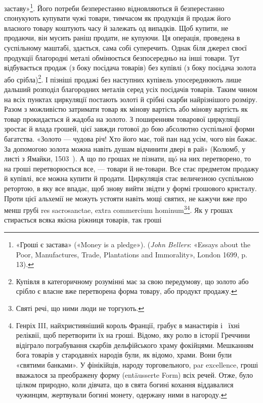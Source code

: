 \parcont{}  %
заставу»\footnote{
«Гроші є застава» («Money is a pledge»). (\emph{John Bellers}: «Essays
about the Poor, Manufactures, Trade, Plantations and Immorality», London
1699, p. 13).
}. Його потреби безперестанно відновляються й безперестанно
спонукують купувати чужі товари, тимчасом як продукція
й продаж його власного товару коштують часу й залежать
од випадків. Щоб купити, не продаючи, він мусить раніш продати,
не купуючи. Ця операція, проведена в суспільному маштабі,
здається, сама собі суперечить. Однак біля джерел своєї продукції
благородні металі обмінюється безпосередньо на інші товари.
Тут відбувається продаж (з боку посідача товарів) без купівлі
(з боку посідача золота або срібла)\footnote{
Купівля в категоричному розумінні має за свою передумову, що
золото або срібло є власне вже перетворена форма товару, або продукт
продажу.
}. І пізніші продажі без наступних
купівель упосереднюють лише дальший розподіл благородних
металів серед усіх посідачів товарів. Таким чином на
всіх пунктах циркуляції постають золоті й срібні скарби найрізнішого
розміру. Разом з можливістю затримати товар як
мінову вартість або мінову вартість як товар прокидається й
жадоба на золото. З поширенням товарової циркуляції зростає й
влада грошей, цієї завжди готової до бою абсолютно суспільної
форми багатства. «Золото — чудова річ! Хто його має, той пан
над усім, чого він бажає. За допомогою золота можна навіть
душам відчинити двері в рай» (Колюмб, у листі з Ямайки, 1503~).
А що по грошах не пізнати, щó на них перетворено, то на гроші
перетворюється все, — товари й не-товари. Все стає предметом
продажу й купівлі, все можна купити й продати. Циркуляція
стає величезною суспільною ретортою, в яку все впадає, щоб
знову вийти звідти у формі грошового кристалу. Проти цієї
альхемії не можуть устояти навіть мощі святих, не кажучи вже
про менш грубі res sacrosanctae, extra commercium hominum\footnote*{
Святі речі, що ними люди не торгують. 
}\footnote{
Генріх III, найхристияніший король Франції, грабує в манастирів
і~ їхні реліквії, щоб перетворити їх на гроші. Відомо, яку ролю
в історії Греччини відіграло пограбування скарбів дельфійського храму
фокійцями. Мешканням бога товарів у стародавніх народів були, як відомо,
храми. Вони були «святими банками». У фінікійців, народу торговельного,
par excellence, гроші вважалося за преображену форму (entäusserte
Form) всіх речей. Отже, було цілком природно, коли дівчата, що в
свята богині кохання віддавалися чужинцям, жертвували богині монету,
одержану ними в нагороду.
}. Як у грошах стирається всяка якісна ріжниця товарів, так гроші
